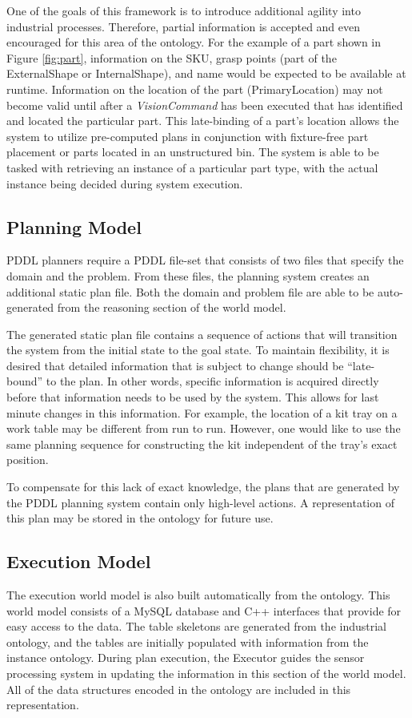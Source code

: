One of the goals of this framework is to introduce additional agility into industrial processes. Therefore,
partial information is accepted and even encouraged for this area of the ontology. For the example of a part shown in Figure \ref{fig:part}, information on the SKU, grasp points 
(part of the ExternalShape or InternalShape), and name would be expected to be available at runtime. Information on the location of the part (PrimaryLocation) may not
become valid until after a \textit{VisionCommand} has been executed
that has identified and located the particular part. This late-binding of a part's location
allows the system to utilize pre-computed plans in conjunction with fixture-free part
placement or parts located in an
unstructured bin. The system is able to be tasked with retrieving an instance of a 
particular part type, with the actual instance being decided during system execution.
%
\subsection{Planning Model}
PDDL planners require a PDDL file-set that consists of two files that specify the domain and the problem.
From these files, the planning system creates an additional static plan file. Both the domain and problem file are able to be auto-generated from the reasoning section of the world model.

The generated static plan file contains a sequence of actions that will transition the system from the initial state to the goal state. To maintain flexibility, it is desired that detailed information that is subject to change should be ``late-bound'' to the plan. In other words, specific information is acquired directly before that information needs to be used by the system. This allows for last minute changes in this information. For example, the location of a kit tray on a work table may be different from run to run. However, one would like to use the same planning sequence for constructing the kit independent of the tray's exact position.

To compensate for this lack of exact knowledge, the plans that are generated by the PDDL planning system contain only high-level actions. A representation of this plan may be stored in the ontology for future use.
% 
\subsection{Execution Model}
The execution world model is also built automatically from the
ontology. This world model consists of a MySQL database and C++ 
interfaces
that provide for easy access to the data. The table skeletons are 
generated from
the industrial ontology, and the tables are initially populated with 
information
from the instance ontology. During plan execution, the Executor 
guides the
sensor processing system in updating the information in this section 
of the world
model. All of the data structures encoded in the ontology are 
included in this
representation.
%
